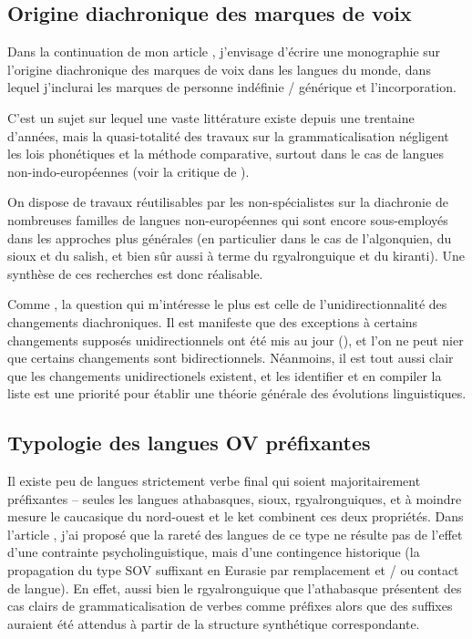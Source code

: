 \documentclass[oldfontcommands,oneside,a4paper,11pt]{article}
\begin{document}
 
 \subsection{Origine diachronique des marques de voix} 
Dans  la continuation de mon article \citet{jacques14antipassive}, j'envisage d'écrire une monographie sur l'origine diachronique des marques de voix dans les langues du monde, dans lequel j'inclurai les marques de personne indéfinie / générique et l'incorporation.

C'est un sujet sur lequel une vaste littérature  existe depuis une trentaine d'années, mais la quasi-totalité des travaux sur la grammaticalisation négligent les lois phonétiques et la méthode comparative, surtout dans le cas de langues non-indo-européennes (voir la critique de \citealt{heath98hermit}).

On dispose de travaux réutilisables par les non-spécialistes sur la diachronie de nombreuses familles de langues non-européennes qui sont encore sous-employés dans les approches plus générales (en particulier dans le cas de l'algonquien, du sioux et du salish, et bien sûr aussi à terme du rgyalronguique et du kiranti). Une synthèse de ces recherches est donc réalisable.

 Comme \citet{haspelmath90passive}, la question qui m'intéresse le plus est celle de l'unidirectionnalité des changements diachroniques. Il est manifeste que des exceptions à certains changements supposés unidirectionnels ont été mis au jour (\citealt{norde09degrammaticalization}), et  l'on ne peut nier que certains changements sont bidirectionnels. Néanmoins, il est tout aussi clair que les changements unidirectionels existent, et les identifier et en compiler la liste est une priorité pour établir une théorie générale des évolutions linguistiques.  
 
 
 
  \subsection{Typologie des langues OV préfixantes} 
 Il existe peu de langues strictement verbe final qui soient majoritairement préfixantes -- seules les langues athabasques, sioux, rgyalronguiques, et à moindre mesure le caucasique du nord-ouest et le ket combinent ces deux propriétés. Dans l'article  \citet{jacques13harmonization}, j'ai proposé que la rareté des langues de ce type ne résulte pas de l'effet d'une contrainte psycholinguistique, mais d'une contingence historique (la propagation du type SOV suffixant en Eurasie par remplacement et / ou contact de langue).  En effet, aussi bien le rgyalronguique que l'athabasque présentent des cas clairs de grammaticalisation de verbes comme préfixes alors que des suffixes auraient été attendus à partir de la structure synthétique correspondante.
 
\end{document}
